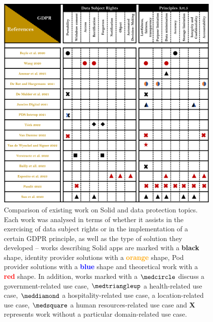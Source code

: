 \begin{figure}
\caption[Comparison of existing work on Solid and data protection topics.]{Comparison of existing work on Solid and data protection topics. Each work was analysed in terms of whether it assists in the exercising of data subject rights or in the implementation of a certain GDPR principle, as well as the type of solution they developed -- works describing Solid apps are marked with a \textbf{black} shape, identity provider solutions with a \textbf{\textcolor{orange}{orange}} shape, Pod provider solutions with a \textbf{\textcolor{blue}{blue}} shape and theoretical work with a \textbf{\textcolor{red}{red}} shape. In addition, works marked with a $\medcircle$ discuss a government-related use case, $\medtriangleup$ a health-related use case, $\meddiamond$ a hospitality-related use case, \faStarO\space a location-related use case, $\medsquare$ a human resources-related use case and \textbf{X} represents work without a particular domain-related use case.}
\label{fig:solid_sota}
\centering
\includegraphics[width=\textwidth]{figures/chapter-2/solid-sota.png}
\end{figure}


